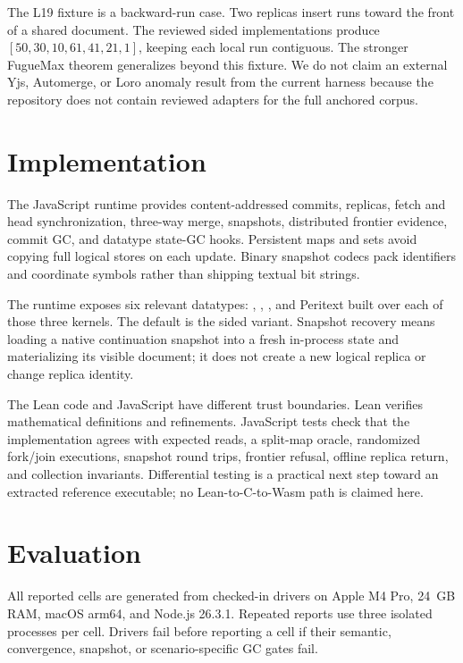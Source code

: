 The L19 fixture is a backward-run case. Two replicas insert runs toward the
front of a shared document. The reviewed sided implementations produce
$[50,30,10,61,41,21,1]$, keeping each local run contiguous. The stronger
FugueMax theorem generalizes beyond this fixture. We do not claim an external
Yjs, Automerge, or Loro anomaly result from the current harness because the
repository does not contain reviewed adapters for the full anchored corpus.

\section{Implementation}

The JavaScript runtime provides content-addressed commits, replicas, fetch and
head synchronization, three-way merge, snapshots, distributed frontier
evidence, commit GC, and datatype state-GC hooks. Persistent maps and sets
avoid copying full logical stores on each update. Binary snapshot codecs pack
identifiers and coordinate symbols rather than shipping textual bit strings.

The runtime exposes six relevant datatypes:
, , , and Peritext built
over each of those three kernels. The default  is the sided
variant. Snapshot recovery means loading a native continuation snapshot into
a fresh in-process state and materializing its visible document; it does not
create a new logical replica or change replica identity.

The Lean code and JavaScript have different trust boundaries. Lean verifies
mathematical definitions and refinements. JavaScript tests check that the
implementation agrees with expected reads, a split-map oracle, randomized
fork/join executions, snapshot round trips, frontier refusal, offline replica
return, and collection invariants. Differential testing is a practical next
step toward an extracted reference executable; no Lean-to-C-to-Wasm path is
claimed here.

\section{Evaluation}
\label{sec:eval}

All reported cells are generated from checked-in drivers on Apple M4 Pro,
24~GB RAM, macOS arm64, and Node.js 26.3.1. Repeated reports use three isolated
processes per cell. Drivers fail before reporting a cell if their semantic,
convergence, snapshot, or scenario-specific GC gates fail.

